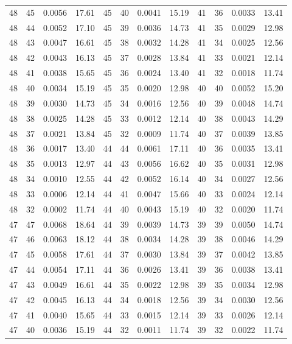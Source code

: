 \begin{tabular}{llll|llll|llll}
48 & 45 & 0.0056 & 17.61 & 45 & 40 & 0.0041 & 15.19 & 41 & 36 & 0.0033 & 13.41\\
48 & 44 & 0.0052 & 17.10 & 45 & 39 & 0.0036 & 14.73 & 41 & 35 & 0.0029 & 12.98\\
48 & 43 & 0.0047 & 16.61 & 45 & 38 & 0.0032 & 14.28 & 41 & 34 & 0.0025 & 12.56\\
48 & 42 & 0.0043 & 16.13 & 45 & 37 & 0.0028 & 13.84 & 41 & 33 & 0.0021 & 12.14\\
48 & 41 & 0.0038 & 15.65 & 45 & 36 & 0.0024 & 13.40 & 41 & 32 & 0.0018 & 11.74\\
48 & 40 & 0.0034 & 15.19 & 45 & 35 & 0.0020 & 12.98 & 40 & 40 & 0.0052 & 15.20\\
48 & 39 & 0.0030 & 14.73 & 45 & 34 & 0.0016 & 12.56 & 40 & 39 & 0.0048 & 14.74\\
48 & 38 & 0.0025 & 14.28 & 45 & 33 & 0.0012 & 12.14 & 40 & 38 & 0.0043 & 14.29\\
48 & 37 & 0.0021 & 13.84 & 45 & 32 & 0.0009 & 11.74 & 40 & 37 & 0.0039 & 13.85\\
48 & 36 & 0.0017 & 13.40 & 44 & 44 & 0.0061 & 17.11 & 40 & 36 & 0.0035 & 13.41\\
48 & 35 & 0.0013 & 12.97 & 44 & 43 & 0.0056 & 16.62 & 40 & 35 & 0.0031 & 12.98\\
48 & 34 & 0.0010 & 12.55 & 44 & 42 & 0.0052 & 16.14 & 40 & 34 & 0.0027 & 12.56\\
48 & 33 & 0.0006 & 12.14 & 44 & 41 & 0.0047 & 15.66 & 40 & 33 & 0.0024 & 12.14\\
48 & 32 & 0.0002 & 11.74 & 44 & 40 & 0.0043 & 15.19 & 40 & 32 & 0.0020 & 11.74\\
47 & 47 & 0.0068 & 18.64 & 44 & 39 & 0.0039 & 14.73 & 39 & 39 & 0.0050 & 14.74\\
47 & 46 & 0.0063 & 18.12 & 44 & 38 & 0.0034 & 14.28 & 39 & 38 & 0.0046 & 14.29\\
47 & 45 & 0.0058 & 17.61 & 44 & 37 & 0.0030 & 13.84 & 39 & 37 & 0.0042 & 13.85\\
47 & 44 & 0.0054 & 17.11 & 44 & 36 & 0.0026 & 13.41 & 39 & 36 & 0.0038 & 13.41\\
47 & 43 & 0.0049 & 16.61 & 44 & 35 & 0.0022 & 12.98 & 39 & 35 & 0.0034 & 12.98\\
47 & 42 & 0.0045 & 16.13 & 44 & 34 & 0.0018 & 12.56 & 39 & 34 & 0.0030 & 12.56\\
47 & 41 & 0.0040 & 15.65 & 44 & 33 & 0.0015 & 12.14 & 39 & 33 & 0.0026 & 12.14\\
47 & 40 & 0.0036 & 15.19 & 44 & 32 & 0.0011 & 11.74 & 39 & 32 & 0.0022 & 11.74\\

\end{tabular}
